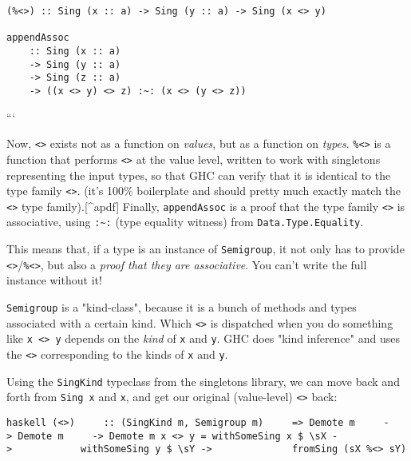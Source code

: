 \documentclass[]{article}
\begin{document}
\begin{verbatim}
(%<>) :: Sing (x :: a) -> Sing (y :: a) -> Sing (x <> y)

appendAssoc
    :: Sing (x :: a)
    -> Sing (y :: a)
    -> Sing (z :: a)
    -> ((x <> y) <> z) :~: (x <> (y <> z))
\end{verbatim}

```

Now, \texttt{\textless{}\textgreater{}} exists not as a function on
\emph{values}, but as a function on \emph{types}.
\texttt{\%\textless{}\textgreater{}} is a function that performs
\texttt{\textless{}\textgreater{}} at the value level, written to work with
singletons representing the input types, so that GHC can verify that it is
identical to the type family \texttt{\textless{}\textgreater{}}. (it's 100\%
boilerplate and should pretty much exactly match the
\texttt{\textless{}\textgreater{}} type family).{[}\^{}apdf{]} Finally,
\texttt{appendAssoc} is a proof that the type family
\texttt{\textless{}\textgreater{}} is associative, using
\texttt{:\textasciitilde{}:} (type equality witness) from
\texttt{Data.Type.Equality}.

This means that, if a type is an instance of \texttt{Semigroup}, it not only has
to provide
\texttt{\textless{}\textgreater{}}/\texttt{\%\textless{}\textgreater{}}, but
also a \emph{proof that they are associative}. You can't write the full instance
without it!

\texttt{Semigroup} is a "kind-class", because it is a bunch of methods and types
associated with a certain kind. Which \texttt{\textless{}\textgreater{}} is
dispatched when you do something like \texttt{x\ \textless{}\textgreater{}\ y}
depends on the \emph{kind} of \texttt{x} and \texttt{y}. GHC does "kind
inference" and uses the \texttt{\textless{}\textgreater{}} corresponding to the
kinds of \texttt{x} and \texttt{y}.

Using the \texttt{SingKind} typeclass from the singletons library, we can move
back and forth from \texttt{Sing\ x} and \texttt{x}, and get our original
(value-level) \texttt{\textless{}\textgreater{}} back:

\texttt{haskell\ (\textless{}\textgreater{})\ \ \ \ \ ::\ (SingKind\ m,\ Semigroup\ m)\ \ \ \ \ =\textgreater{}\ Demote\ m\ \ \ \ \ -\textgreater{}\ Demote\ m\ \ \ \ \ -\textgreater{}\ Demote\ m\ x\ \textless{}\textgreater{}\ y\ =\ withSomeSing\ x\ \$\ \textbackslash{}sX\ -\textgreater{}\ \ \ \ \ \ \ \ \ \ \ \ withSomeSing\ y\ \$\ \textbackslash{}sY\ -\textgreater{}\ \ \ \ \ \ \ \ \ \ \ \ \ \ fromSing\ (sX\ \%\textless{}\textgreater{}\ sY)}
\end{document}
